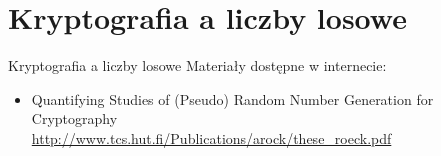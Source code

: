 \section{Kryptografia a liczby losowe}
\begin{frame}{Kryptografia a liczby losowe}
	Materiały dostępne w internecie:
	\begin{itemize}
		\item Quantifying Studies of (Pseudo) Random Number Generation for Cryptography\\
		\url{http://www.tcs.hut.fi/Publications/arock/these_roeck.pdf}
	\end{itemize}
\end{frame}